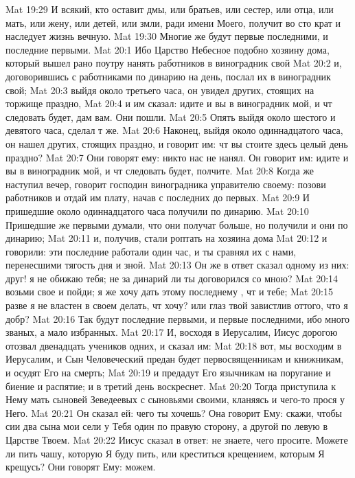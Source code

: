 \vs Mat 19:29 И всякий, кто оставит дмы, или братьев, или сестер, или отца, или мать, или жену, или детей, или змли, ради имени Моего, получит во сто крат и наследует жизнь вечную.
\vs Mat 19:30 Многие же будут первые последними, и последние первыми.
\vs Mat 20:1 Ибо Царство Небесное подобно хозяину дома, который вышел рано поутру нанять работников в виноградник свой
\vs Mat 20:2 и, договорившись с работниками по динарию на день, послал их в виноградник свой;
\vs Mat 20:3 выйдя около третьего часа, он увидел других, стоящих на торжище праздно,
\vs Mat 20:4 и им сказал: идите и вы в виноградник мой, и чт следовать будет, дам вам. Они пошли.
\vs Mat 20:5 Опять выйдя около шестого и девятого часа, сделал т же.
\vs Mat 20:6 Наконец, выйдя около одиннадцатого часа, он нашел других, стоящих праздно, и говорит им: чт вы стоите здесь целый день праздно?
\vs Mat 20:7 Они говорят ему: никто нас не нанял. Он говорит им: идите и вы в виноградник мой, и чт следовать будет, полчите.
\vs Mat 20:8 Когда же наступил вечер, говорит господин виноградника управителю своему: позови работников и отдай им плату, начав с последних до первых.
\vs Mat 20:9 И пришедшие около одиннадцатого часа получили по динарию.
\vs Mat 20:10 Пришедшие же первыми думали, что они получат больше, но получили и они по динарию;
\vs Mat 20:11 и, получив, стали роптать на хозяина дома
\vs Mat 20:12 и говорили: эти последние работали один час, и ты сравнял их с нами, перенесшими тягость дня и зной.
\vs Mat 20:13 Он же в ответ сказал одному из них: друг! я не обижаю тебя; не за динарий ли ты договорился со мною?
\vs Mat 20:14 возьми свое и пойди; я же хочу дать этому последнему , чт и тебе;
\vs Mat 20:15 разве я не властен в своем делать, чт хочу? или глаз твой завистлив оттого, что я добр?
\vs Mat 20:16 Так будут последние первыми, и первые последними, ибо много званых, а мало избранных.
\rsbpar\vs Mat 20:17 И, восходя в Иерусалим, Иисус дорогою отозвал двенадцать учеников одних, и сказал им:
\vs Mat 20:18 вот, мы восходим в Иерусалим, и Сын Человеческий предан будет первосвященникам и книжникам, и осудят Его на смерть;
\vs Mat 20:19 и предадут Его язычникам на поругание и биение и распятие; и в третий день воскреснет.
\rsbpar\vs Mat 20:20 Тогда приступила к Нему мать сыновей Зеведеевых с сыновьями своими, кланяясь и чего-то прося у Него.
\vs Mat 20:21 Он сказал ей: чего ты хочешь? Она говорит Ему: скажи, чтобы сии два сына мои сели у Тебя один по правую сторону, а другой по левую в Царстве Твоем.
\vs Mat 20:22 Иисус сказал в ответ: не знаете, чего просите. Можете ли пить чашу, которую Я буду пить, или креститься крещением, которым Я крещусь? Они говорят Ему: можем.
